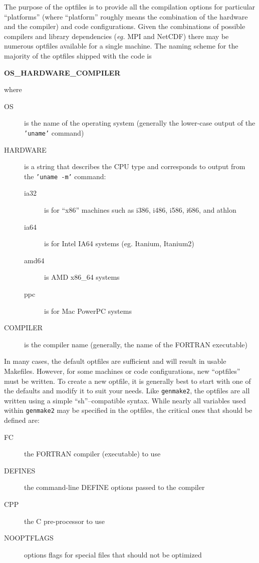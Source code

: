 The purpose of the optfiles is to provide all the compilation options
for particular ``platforms'' (where ``platform'' roughly means the
combination of the hardware and the compiler) and code configurations.
Given the combinations of possible compilers and library dependencies
({\it eg.}  MPI and NetCDF) there may be numerous optfiles available
for a single machine.  The naming scheme for the majority of the
optfiles shipped with the code is
\begin{center}
  {\bf OS\_HARDWARE\_COMPILER }
\end{center}
where
\begin{description}
\item[OS] is the name of the operating system (generally the
  lower-case output of the {\tt 'uname'} command)
\item[HARDWARE] is a string that describes the CPU type and
  corresponds to output from the  {\tt 'uname -m'} command:
  \begin{description}
  \item[ia32] is for ``x86'' machines such as i386, i486, i586, i686,
    and athlon
  \item[ia64] is for Intel IA64 systems (eg. Itanium, Itanium2)
  \item[amd64] is AMD x86\_64 systems
  \item[ppc] is for Mac PowerPC systems
  \end{description}
\item[COMPILER] is the compiler name (generally, the name of the
  FORTRAN executable)
\end{description}

In many cases, the default optfiles are sufficient and will result in
usable Makefiles.  However, for some machines or code configurations,
new ``optfiles'' must be written. To create a new optfile, it is
generally best to start with one of the defaults and modify it to suit
your needs.  Like \texttt{genmake2}, the optfiles are all written
using a simple ``sh''--compatible syntax.  While nearly all variables
used within \texttt{genmake2} may be specified in the optfiles, the
critical ones that should be defined are:

\begin{description}
\item[FC] the FORTRAN compiler (executable) to use
\item[DEFINES] the command-line DEFINE options passed to the compiler
\item[CPP] the C pre-processor to use
\item[NOOPTFLAGS] options flags for special files that should not be
  optimized
\end{description}

